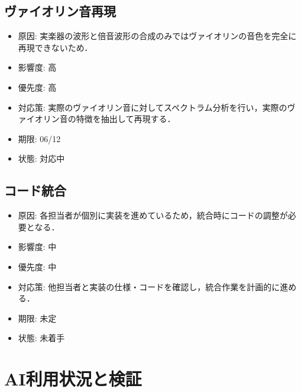 \documentclass[lualatex,paper=a4paper,jafontsize=11.5pt,jafontscale=1.05]{jlreq}
\begin{document}
\subsection{ヴァイオリン音再現}
\begin{itemize}
  \item 原因: 実楽器の波形と倍音波形の合成のみではヴァイオリンの音色を完全に再現できないため．
  \item 影響度: 高
  \item 優先度: 高
  \item 対応策: 実際のヴァイオリン音に対してスペクトラム分析を行い，実際のヴァイオリン音の特徴を抽出して再現する．
  \item 期限: 06/12
  \item 状態: 対応中
\end{itemize}

\subsection{コード統合}
\begin{itemize}
  \item 原因: 各担当者が個別に実装を進めているため，統合時にコードの調整が必要となる．
  \item 影響度: 中
  \item 優先度: 中
  \item 対応策: 他担当者と実装の仕様・コードを確認し，統合作業を計画的に進める．
  \item 期限: 未定
  \item 状態: 未着手
\end{itemize}



\section{AI利用状況と検証}
\end{document}
